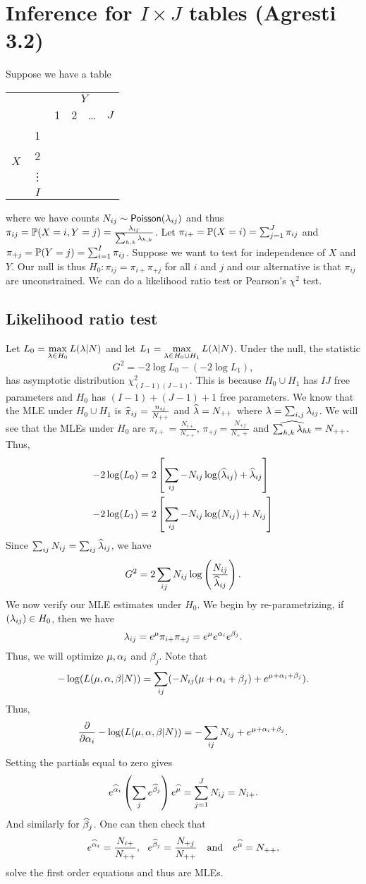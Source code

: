 \section{Inference for $I\times J$ tables (Agresti 3.2)}
Suppose we have a table
\begin{center}
    \begin{tabular}{cc|cccc}
        &&\multicolumn{4}{c}{$Y$}\\
        &&1&2&\ldots&$J$\\
        \hline 
        \multirow{4}{*}{$X$}&1\\
        &2\\
        &\vdots \\
        &$I$
    \end{tabular}
\end{center}
where we have counts $N_{ij} \sim \mathsf{Poisson}(\lambda_{ij})$ and thus $\pi_{ij}={\mathbb{P}}(X=i,Y=j) = \frac{\lambda_{ij}}{\sum_{h,k}\lambda_{h,k}}$. Let $\pi_{i+} ={\mathbb{P}}(X=i)=\sum_{j=1}^J \pi_{ij}$ and $\pi_{+j} ={\mathbb{P}}(Y=j)=\sum_{i=1}^I \pi_{ij}$. Suppose we want to test for independence of $X$ and $Y$. Our null is thus $H_0 :\pi_{ij} =\pi_{i+}\pi_{+j}$ for all $i$ and $j$ and our alternative is that $\pi_{ij}$ are unconstrained. We can do a likelihood ratio test or Pearson's $\chi^2$ test.
\subsection{Likelihood ratio test}
Let $L_0 = \max\limits_{\lambda \in H_0}L(\lambda|N)$ and let $L_1 = \max\limits_{\lambda \in H_0 \cup H_1}L(\lambda |N)$. Under the null, the statistic
\[G^2 = -2\log L_0-(-2\log L_1 ),\]
has asymptotic distribution $\chi^2_{(I-1)(J-1)}$. This is because $H_0 \cup H_1$ has $IJ$ free parameters and $H_0$ has $(I-1)+(J-1)+1$ free parameters. We know that the MLE under $H_0 \cup H_1$ is $\widehat{\pi}_{ij} = \frac{n_{ij}}{N_{++}}$ and $\widehat{\lambda}=N_{++}$ where $\lambda = \sum_{i,j}\lambda_{ij}$. We will see that the MLEs under $H_0$ are $\pi_{i+} = \frac{N_{i+}}{N_{++}}$, $\pi_{+j} = \frac{N_{+j}}{N_++}$ and $\widehat{\sum_{h,k} \lambda_{hk}}=N_{++}$. Thus,
\begin{align*}
    -2\log(L_0)& =2\left[\sum_{ij} -N_{ij}\log(\widehat{\lambda}_{ij})+\widehat{\lambda}_{ij}\right] \\
    -2\log(L_1) &=2\left[\sum_{ij} -N_{ij}\log(N_{ij})+N_{ij}\right]
\end{align*}
Since $\sum_{ij} N_{ij} = \sum_{ij}\widehat{\lambda}_{ij}$, we have
\[G^2 = 2\sum_{ij} N_{ij}\log\left(\frac{N_{ij}}{\widehat{\lambda}_{ij}}\right).\]
We now verify our MLE estimates under $H_0$. We begin by re-parametrizing, if $(\lambda_{ij}) \in H_0$, then we have 
\[\lambda_{ij} = e^\mu \pi_{i+}\pi_{+j} =e^\mu e^{{\alpha}_i} e^{\beta_j}.\]
Thus, we will optimize $\mu,{\alpha}_i$ and $\beta_j$. Note that 
\[ -\log(L(\mu,{\alpha},\beta|N)) = \sum_{ij}(-N_{ij}(\mu+{\alpha}_i+\beta_j)+e^{\mu+{\alpha}_i+\beta_j}).\]
Thus,
\[\frac{\partial}{\partial {\alpha}_i} -\log(L(\mu,{\alpha},\beta|N)) = -\sum_{ij} N_{ij}+e^{\mu+{\alpha}_i+\beta_j}.\] 
Setting the partials equal to zero gives
\[e^{\widehat{{\alpha}}_i}\left(\sum_{j} e^{\widehat{\beta}_j}\right)e^{\widehat{\mu}} = \sum_{j=1}^J N_{ij} = N_{i+}.\]
And similarly for $\widehat{\beta}_j$. One can then check that 
\[e^{\widehat{{\alpha}}_i} = \frac{N_{i+}}{N_{++}}, ~~e^{\widehat{\beta}_j} =\frac{N_{+j}}{N_{++}} ~~\text{ and } ~~ e^{\widehat{\mu}} = N_{++},\]
solve the first order equations and thus are MLEs.

